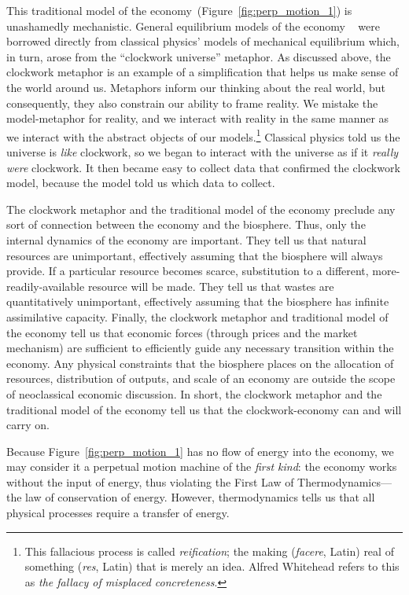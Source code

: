 This traditional model of the economy~(Figure~\ref{fig:perp_motion_1}) 
is unashamedly mechanistic.
General equilibrium models of the economy
~\cite{Walras1892, Walras1993}
were borrowed directly from classical physics' models of 
mechanical equilibrium which, in turn, arose from the 
``clockwork universe'' metaphor.\cite{Ingrao1990}
As discussed above, 
the clockwork metaphor is an example  
of a simplification that helps us make sense of the world around us.
Metaphors inform our thinking about the real world,
but consequently,
they also constrain our ability to frame reality.
We mistake the model-metaphor for reality, and
we interact with reality in the same manner 
as we interact with the abstract objects of our
models.\footnote{This fallacious process is called
	\emph{reification}; the making (\emph{facere}, Latin) real of
	something (\emph{res}, Latin) that is merely an idea.
	Alfred Whitehead refers to this as
	\emph{the fallacy of misplaced concreteness}.\cite{Whitehead2011}
	}
Classical physics told us the universe is
\emph{like} clockwork, 
so we began to interact with the universe
as if it \emph{really were} clockwork.
It then became easy to collect data that confirmed the clockwork model,
because the model told us which data to collect.

The clockwork metaphor and the traditional model of the economy
preclude any sort of connection 
between the economy and the biosphere.
Thus, only the internal dynamics of the economy are important. 
They tell us that natural resources are unimportant, 
effectively assuming that the biosphere will always provide.
If a particular resource becomes scarce, 
substitution to a different, more-readily-available resource will be made.
They tell us that wastes are quantitatively unimportant, 
effectively assuming that the biosphere has infinite assimilative capacity.
Finally, the clockwork metaphor and traditional model of the economy 
tell us that economic forces 
(through prices and the market mechanism) 
are sufficient to efficiently guide any necessary transition
within the economy.
Any physical constraints that the biosphere places on 
the allocation of resources, distribution of outputs, and 
scale of an economy 
are outside the scope of neoclassical economic discussion.\cite{Daly1995}
In short, the clockwork metaphor and the traditional model of the economy 
tell us that the clockwork-economy can and will carry on.

Because Figure~\ref{fig:perp_motion_1} has no flow of energy
into the economy,
we may consider it a perpetual motion machine
of the \emph{first kind}:
the economy works without the input of energy, thus violating
the First Law of Thermodynamics---the 
law of conservation of energy.\cite{Rao2004}
However, thermodynamics tells us that all physical processes 
require a transfer of energy.


